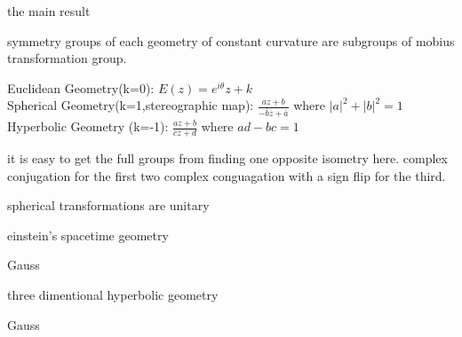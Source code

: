 \documentclass{article}
\newenvironment{andrew_section}[1]
    {
    \section{#1}
    \begin{itemize}
    }
    {
    \end{itemize}
    }
\begin{document}
\begin{andrew_section}{the main result}
    \item 
        symmetry groups of each geometry of constant curvature are subgroups
        of mobius transformation group.
    \item 
        Euclidean Geometry(k=0): $E(z) = e^{i\theta}z + k$ \\
        Spherical Geometry(k=1,stereographic map): $\frac{az+b}{-\bar{b}z + \bar{a}}$
        where $|a|^2 + |b|^2 = 1$ \\
        Hyperbolic Geometry (k=-1): $\frac{az +b}{cz+d}$ where $ad-bc = 1$
    \item 
        it is easy to get the full groups from finding one opposite isometry
        here.  complex conjugation for the first two complex conguagation with
        a sign flip for the third.
    \item 
        spherical transformations are unitary

\end{andrew_section}

\begin{andrew_section}{einstein's spacetime geometry}
    \item 
        Gauss
\end{andrew_section}

\begin{andrew_section}{three dimentional hyperbolic geometry}
    \item 
        Gauss
\end{andrew_section}
\end{document}
